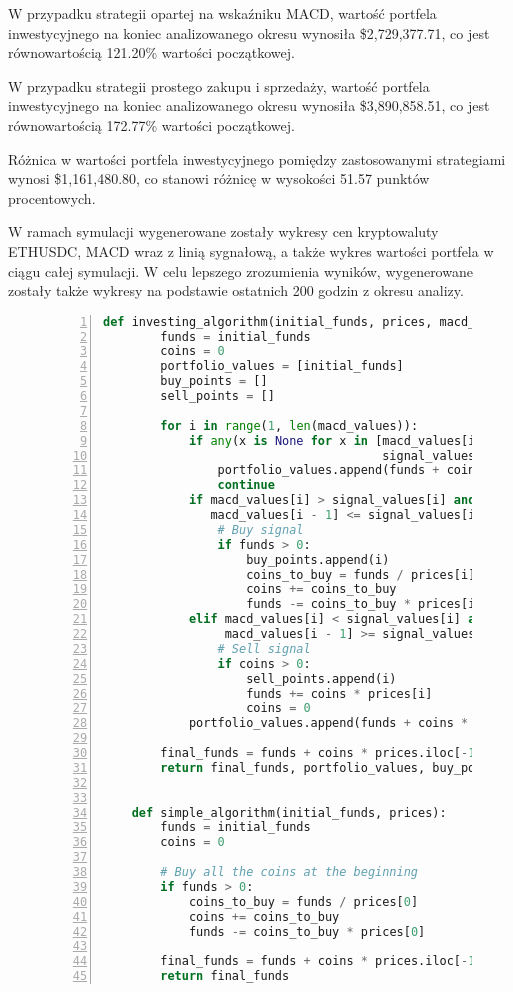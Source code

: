 \documentclass{article}
\begin{document}
    W przypadku strategii opartej na wskaźniku MACD, wartość portfela inwestycyjnego na koniec analizowanego okresu wynosiła \$2,729,377.71, co jest równowartością 121.20\% wartości początkowej.

    W przypadku strategii prostego zakupu i sprzedaży, wartość portfela inwestycyjnego na koniec analizowanego okresu wynosiła \$3,890,858.51, co jest równowartością 172.77\% wartości początkowej.

    Różnica w wartości portfela inwestycyjnego pomiędzy zastosowanymi strategiami wynosi \$1,161,480.80, co stanowi różnicę w wysokości 51.57 punktów procentowych.

    W ramach symulacji wygenerowane zostały wykresy cen kryptowaluty ETHUSDC, MACD wraz z linią sygnałową, a także wykres wartości portfela w ciągu całej symulacji. W celu lepszego zrozumienia wyników, wygenerowane zostały także wykresy na podstawie ostatnich 200 godzin z okresu analizy.

    \begin{figure}[H]
        \begin{lstlisting}[language=Python, caption={Source code in Python}, label={lst:lstlisting}, frame=single, numbers=left]
    def investing_algorithm(initial_funds, prices, macd_values, signal_values):
        funds = initial_funds
        coins = 0
        portfolio_values = [initial_funds]
        buy_points = []
        sell_points = []

        for i in range(1, len(macd_values)):
            if any(x is None for x in [macd_values[i], macd_values[i - 1],
                                       signal_values[i], signal_values[i - 1]]):
                portfolio_values.append(funds + coins * prices[i])
                continue
            if macd_values[i] > signal_values[i] and \
               macd_values[i - 1] <= signal_values[i - 1]:
                # Buy signal
                if funds > 0:
                    buy_points.append(i)
                    coins_to_buy = funds / prices[i]
                    coins += coins_to_buy
                    funds -= coins_to_buy * prices[i]
            elif macd_values[i] < signal_values[i] and \
                 macd_values[i - 1] >= signal_values[i - 1]:
                # Sell signal
                if coins > 0:
                    sell_points.append(i)
                    funds += coins * prices[i]
                    coins = 0
            portfolio_values.append(funds + coins * prices[i])

        final_funds = funds + coins * prices.iloc[-1]
        return final_funds, portfolio_values, buy_points, sell_points


    def simple_algorithm(initial_funds, prices):
        funds = initial_funds
        coins = 0

        # Buy all the coins at the beginning
        if funds > 0:
            coins_to_buy = funds / prices[0]
            coins += coins_to_buy
            funds -= coins_to_buy * prices[0]

        final_funds = funds + coins * prices.iloc[-1]
        return final_funds
        \end{lstlisting}\label{fig:figure}
    \end{figure}
\end{document}
